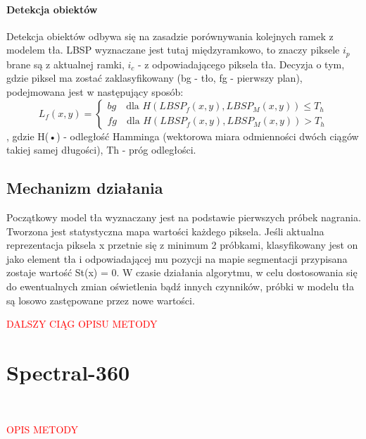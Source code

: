 \paragraph{Detekcja obiektów \\}
Detekcja obiektów odbywa się na zasadzie porównywania kolejnych ramek z modelem tła. LBSP wyznaczane jest tutaj międzyramkowo, to znaczy piksele $i_{p}$ brane są z aktualnej ramki, $i_{c}$ - z odpowiadającego piksela tła. Decyzja o tym, gdzie piksel ma zostać zaklasyfikowany (bg - tło, fg - pierwszy plan), podejmowana jest w następujący sposób:
\begin{equation}
L_{f}(x,y)=\left\{\substack{
bg \quad \text{dla $H(LBSP_{f}(x,y),LBSP_{M}(x,y))\leq T_{h}$} \\[0.5em]
fg \quad \text{dla $H(LBSP_{f}(x,y),LBSP_{M}(x,y))>T_{h}$}}\right.
\end{equation}
, gdzie H(•) - odległość Hamminga (wektorowa miara odmienności dwóch ciągów takiej samej długości), Th - próg odległości.
\subsection{Mechanizm działania}
Początkowy model tła wyznaczany jest na podstawie pierwszych próbek nagrania. Tworzona jest statystyczna mapa wartości każdego piksela. Jeśli aktualna reprezentacja piksela x przetnie się z minimum 2 próbkami, klasyfikowany jest on jako element tła i odpowiadającej mu pozycji na mapie segmentacji przypisana zostaje wartość St(x) = 0. W czasie działania algorytmu, w celu dostosowania się do ewentualnych zmian oświetlenia bądź innych czynników, próbki w modelu tła są losowo zastępowane przez nowe wartości.\\
\begin{LARGE}
\textcolor{red}{DALSZY CIĄG OPISU METODY}
\end{LARGE}
\section{Spectral-360}
\cite{6910013}\\
\begin{LARGE}
\textcolor{red}{OPIS METODY}
\end{LARGE}


